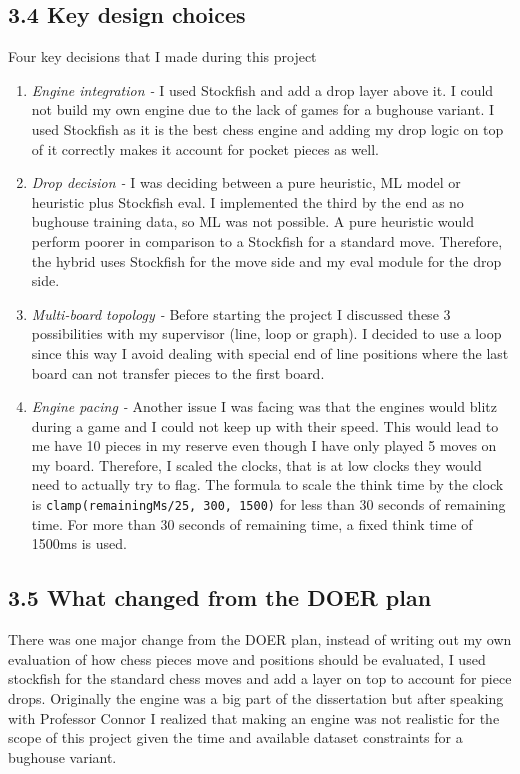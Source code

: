 \documentclass[11pt,a4paper]{article}
\begin{document}
\subsection*{3.4 Key design choices}
Four key decisions that I made during this project
\begin{enumerate}[leftmargin=*]

\item \textit{Engine integration -}  I used Stockfish and add a drop layer above it. I could not build my own engine due to the lack of games for a bughouse variant. I used Stockfish as it is the best chess engine and adding my drop logic on top of it correctly makes it account for pocket pieces as well.
\item \textit{Drop decision -} I was deciding between a pure heuristic, ML model or heuristic plus Stockfish eval. I implemented the third by the end as no bughouse training data, so ML was not possible. A pure heuristic would perform poorer in comparison to a Stockfish for a standard move. Therefore, the hybrid uses Stockfish for the move side and my eval module for the drop side.
\item \textit{Multi-board topology -} Before starting the project I discussed these 3 possibilities with my supervisor (line, loop or graph).  I decided to use a loop since this way I avoid dealing with special end of line positions where the last board can not transfer pieces to the first board.
\item \textit{Engine pacing -}  Another issue I was facing was that the engines would blitz during a game and I could not keep up with their speed. This would lead to me have 10 pieces in my reserve even though I have only played 5 moves on my board. Therefore, I scaled the clocks, that is at low clocks they would need to actually try to flag. The formula to scale the think time by the clock is \texttt{clamp(remainingMs/25, 300, 1500)} for less than 30 seconds of remaining time. For more than 30 seconds of remaining time, a fixed think time of 1500ms is used.
\end{enumerate}
\subsection*{3.5 What changed from the DOER plan}
There was one major change from the DOER plan, instead of writing out my own evaluation of how chess pieces move and positions should be evaluated, I used stockfish for the standard chess moves and add a layer on top to account for piece drops. Originally the engine was a big part of the dissertation but after speaking with Professor Connor I realized that making an engine was not realistic for the scope of this project given the time and available dataset constraints for a bughouse variant.
\end{document}
